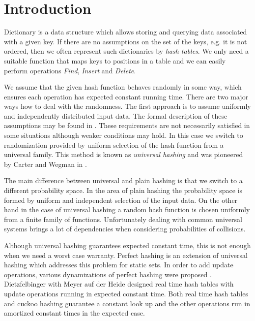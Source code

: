 \section{Introduction}
Dictionary is a data structure which allows storing and querying data associated with a given key. If there are no assumptions on the set of the keys, e.g. it is not ordered, then we often represent such dictionaries by \emph{hash tables}. We only need a suitable function that maps keys to positions in a table and we can easily perform operations \emph{Find}, \emph{Insert} and \emph{Delete}. 

We assume that the given hash function behaves randomly in some way, which ensures each operation has expected constant running time. There are two major ways how to deal with the randomness. The first approach is to assume uniformly and independently distributed input data. The formal description of these assumptions may be found in \cite{DBLP:books/sp/Mehlhorn84}. These requirements are not necessarily satisfied in some situations although weaker conditions may hold. In this case we switch to randomization provided by uniform selection of the hash function from a universal family. This method is known as \emph{universal hashing} and was pioneered by Carter and Wegman in \cite{DBLP:journals/jcss/CarterW79}. 

The main difference between universal and plain hashing is that we switch to a different probability space. In the area of plain hashing the probability space is formed by uniform and independent selection of the input data. On the other hand in the case of universal hashing a random hash function is chosen uniformly from a finite family of functions. Unfortunately dealing with common universal systems brings a lot of dependencies when considering probabilities of collisions.

Although universal hashing guarantees expected constant time, this is not enough when we need a worst case warranty. Perfect hashing \cite{Fredman:1984:SST:828.1884} is an extension of universal hashing which addresses this problem for static sets. In order to add update operations, various dynamizations of perfect hashing were proposed \cite{DBLP:journals/siamcomp/DietzfelbingerKMHRT94,DBLP:conf/icalp/DietzfelbingerH90}. Dietzfelbinger with Meyer auf der Heide designed real time hash tables \cite{DBLP:conf/icalp/DietzfelbingerH90} with update operations running in expected constant time. Both real time hash tables and cuckoo hashing \cite{DBLP:conf/esa/PaghR01} guarantee a constant look up and the other operations run in amortized constant times in the expected case.

